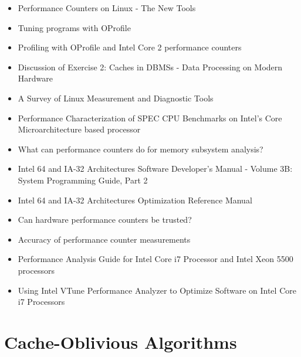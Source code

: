 \begin{itemize}
\item[\textbullet] Performance Counters on Linux - The New Tools
  \cite{Melo2009}
\item[\textbullet] Tuning programs with OProfile \cite{Cohen2004}
\item[\textbullet] Profiling with OProfile and Intel Core 2
  performance counters \cite{Nielsen2008}
\item[\textbullet] Discussion of Exercise 2: Caches in DBMSs - Data
  Processing on Modern Hardware \cite{Muller2009}
\item[\textbullet] A Survey of Linux Measurement and Diagnostic Tools
  \cite{Rowand2009}
\item[\textbullet] Performance Characterization of SPEC CPU Benchmarks
  on Intel's Core Microarchitecture based processor \cite{Bird2007}
\item[\textbullet] What can performance counters do for memory
  subsystem analysis?  \cite{Eranian2008}
\item[\textbullet] Intel \textsuperscript{\textregistered} 64 and
  IA-32 Architectures Software Developer’s Manual - Volume 3B: System
  Programming Guide, Part 2 \cite{Intel2010}
\item[\textbullet] Intel \textsuperscript{\textregistered} 64 and
  IA-32 Architectures Optimization Reference Manual \cite{Intel2009}
\item[\textbullet] Can hardware performance counters be trusted?
  \cite{Weaver2008}
\item[\textbullet] Accuracy of performance counter measurements
  \cite{Zaparanuks2008}
\item[\textbullet] Performance Analysis Guide for Intel
  \textsuperscript{\textregistered} Core
  \textsuperscript{\texttrademark} i7 Processor and Intel
  \textsuperscript{\textregistered} Xeon
  \textsuperscript{\texttrademark} 5500 processors
  \cite{Levinthal2009}
\item[\textbullet] Using Intel \textsuperscript{\textregistered} VTune
  \textsuperscript{\texttrademark} Performance Analyzer to Optimize
  Software on Intel \textsuperscript{\textregistered} Core
  \textsuperscript{\texttrademark} i7 Processors \cite{Intel2009a}
\end{itemize}


\section*{Cache-Oblivious Algorithms}
\label{sec:lr-cache-oblivious-algorithms}


